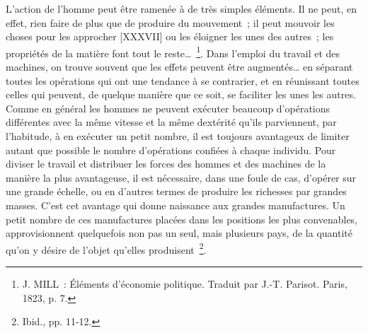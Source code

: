 \documentclass[french,twoside]{book} %
\newenvironment{quoteblock}%
  {\begin{quoting}}
  {\end{quoting}}
\newenvironment{quotebar}{%
    \def\FrameCommand{{\color{rubric!10!}\vrule width 0.5em} \hspace{0.9em}}%
    \def\OuterFrameSep{\itemsep} %
    \MakeFramed {\advance\hsize-\width \FrameRestore}
  }%
  {%
    \endMakeFramed
  }
\renewenvironment{quoteblock}%
  {%
    \savenotes
    \setstretch{0.9}
    \normalfont
    \begin{quotebar}
  }
  {%
    \end{quotebar}
    \spewnotes
  }
\begin{document}
\begin{quoteblock}
 \noindent L’action de l’homme peut être ramenée à de très simples éléments. Il ne peut, en effet, rien faire de plus que de produire du mouvement ; il peut mouvoir les choses pour les approcher [XXXVII] ou les éloigner les unes des autres ; les propriétés de la matière font tout le reste… \footnote{J. MILL : Éléments d’économie politique. Traduit par J.-T. Parisot. Paris, 1823, p. 7.}. Dans l’emploi du travail et des machines, on trouve souvent que les effets peuvent être augmentés… en séparant toutes les opérations qui ont une tendance à se contrarier, et en réunissant toutes celles qui peuvent, de quelque manière que ce soit, se faciliter les unes les autres. Comme en général les hommes ne peuvent exécuter beaucoup d’opérations différentes avec la même vitesse et la même dextérité qu’ils parviennent, par l’habitude, à en exécuter un petit nombre, il est toujours avantageux de limiter autant que possible le nombre d’opérations confiées à chaque individu. Pour diviser le travail et distribuer les forces des hommes et des machines de la manière la plus avantageuse, il est nécessaire, dans une foule de cas, d’opérer sur une grande échelle, ou en d’autres termes de produire les richesses par grandes masses. C’est cet avantage qui donne naissance aux grandes manufactures. Un petit nombre de ces manufactures placées dans les positions les plus convenables, approvisionnent quelquefois non pas un seul, mais plusieurs pays, de la quantité qu’on y désire de l’objet qu’elles produisent \footnote{Ibid., pp. 11-12.}.
 \end{quoteblock}
\end{document}
